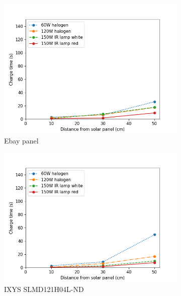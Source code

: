\begin{figure}
	\centering
	\begin{subfigure}[b]{0.62\textwidth}
		\includegraphics[width=\textwidth]{pics/light_experiment_figure1.png}
		\caption{Ebay panel}
		\label{fig:light_exp1}
	\end{subfigure}
	\begin{subfigure}[b]{0.62\textwidth}
		\includegraphics[width=\textwidth]{pics/light_experiment_figure2.png}
		\caption{IXYS SLMD121H04L-ND}
		\label{fig:light_exp2}
	\end{subfigure}
	\begin{subfigure}[b]{0.62\textwidth}

\end{subfigure}
\end{figure}
